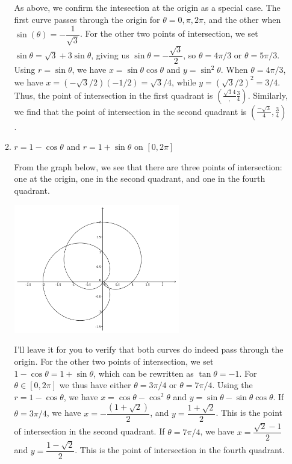 \documentclass[12pt]{article}
\begin{document}
\begin{enumerate}
\begin{enumerate}
As above, we confirm the intesection at the origin as a special case. The first curve passes through the origin for $\theta = 0, \pi, 2\pi$, and the other when $\sin(\theta) = -\dfrac{1}{\sqrt{3}}$. For the other two points of intersection, we set $\sin\theta = \sqrt{3}+3\sin\theta$, giving us $\sin\theta = -\dfrac{\sqrt{3}}{2}$, so $\theta = 4\pi/3$ or $\theta = 5\pi/3$. Using $r=\sin\theta$, we have $x = \sin\theta\cos\theta$ and $y=\sin^2\theta$. When $\theta = 4\pi/3$, we have $x=(-\sqrt{3}/2)(-1/2) = \sqrt{3}/4$, while $y = (\sqrt{3}/2)^2 = 3/4$. Thus, the point of intersection in the first quadrant is $\left(\frac{\sqrt{3}{4}},\frac{3}{4}\right)$. Similarly, we find that the point of intersection in the second quadrant is $\left(\frac{-\sqrt{3}}{4},\frac{3}{4}\right)$.

 \item $r=1-\cos\theta$ and $r=1+\sin\theta$ on $[0,2\pi]$

From the graph below, we see that there are three points of intersection: one at the origin, one in the second quadrant, and one in the fourth quadrant.

\begin{center}
 \includegraphics[width=0.6\textwidth]{WS6-3c}
\end{center}

I'll leave it for you to verify that both curves do indeed pass through the origin. For the other two points of intersection, we set $1-\cos\theta=1+\sin\theta$, which can be rewritten as $\tan\theta = -1$. For $\theta\in [0,2\pi]$ we thus have either $\theta = 3\pi/4$ or $\theta = 7\pi/4$. Using the $r=1-\cos\theta$, we have $x=\cos\theta-\cos^2\theta$ and $y = \sin\theta-\sin\theta\cos\theta$. If $\theta = 3\pi/4$, we have $x=-\dfrac{(1+\sqrt{2})}{2}$, and $y=\dfrac{1+\sqrt{2}}{2}$. This is the point of intersection in the second quadrant. If $\theta = 7\pi/4$, we have $x=\dfrac{\sqrt{2}-1}{2}$ and $y=\dfrac{1-\sqrt{2}}{2}$. This is the point of intersection in the fourth quadrant.


\end{enumerate}
\end{enumerate}
\end{document}
